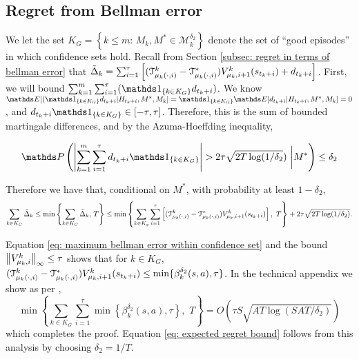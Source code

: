 \subsection{Regret from Bellman error}
We let the set $K_G=\left\{k\leq m: \, M_k, M^{*} \in \mathcal{M}_k^{\delta_{2}} \right\}$ denote the set of ``good episodes'' in which confidence sets hold. 
Recall from Section \ref{subsec: regret in terms of bellman error} that $\tilde{\Delta}_k = \sum_{i=1}^{\tau} \left[(\mathcal{T}_{\mu_{k}(\cdot,i)}^{k}-\mathcal{T}_{\mu_{k}(\cdot,i)}^{*}) V_{\mu_{k}, i+1}^{k}(s_{t_k+i})  + d_{t_k+i} \right] $. First, we will bound 
$\sum_{k=1}^{m} \sum_{i=1}^{\tau} (\Ind_{\{k \in K_G\}} d_{t_{k}+i})$. 
We know $\Exp [(\Ind_{\{k \in K_G\}} d_{t_k+i} |H_{t_k+i}, M^*, M_k]= \Ind_{\{k \in K_G\}}  \Exp [d_{t_k+i} | H_{t_k+i}, M^*, M_k]=0$, and $d_{t_k+i}\Ind_{\{k \in K_G\}}  \in [-\tau, \tau]$. Therefore, this is the sum of bounded martingale differences, and by the Azuma-Hoeffding inequality,

$$\Prob \left( \left\vert \sum_{k=1}^{m} \sum_{i=1}^{\tau} d_{t_{k}+i}\Ind_{\{k\in K_G\}} \right\vert > 2\tau \sqrt{2T \log(1/\delta_{2}}) \,\, \bigg\vert M^*  \right) \leq \delta_{2} $$

Therefore we have that, conditional on $M^*$, with probability at least $1-\delta_{2}$,
\begin{equation*}
\sum_{k\in K_G} \tilde{\Delta}_k \leq \min\left\{ \sum_{k\in K_G}\tilde{\Delta}_k, \, T\right\} \leq \min\left\{ \sum_{k\in K_g}\sum_{i=1}^{\tau} \left[ (\mathcal{T}_{\mu_{k}(\cdot,i)}^{k}-\mathcal{T}_{\mu_{k}(\cdot,i)}^{*}) V_{\mu_{k}, i+1}^{k}(s_{t_k+i})\right] , \,\, T \right\} + 2\tau \sqrt{2T \log(1/\delta_{2})}.
\end{equation*}

Equation \eqref{eq: maximum bellman error within confidence set} and the bound $\left\Vert V_{\mu_{k}, i}^{k} \right\Vert_{\infty}\leq \tau$
 shows that for $k\in K_G$, $(\mathcal{T}_{\mu_{k}(\cdot,i)}^{k}-\mathcal{T}_{\mu_{k}(\cdot,i)}^{*}) V_{\mu_{k}, i+1}^{k}(s_{t_k+i}) \leq \min\{ \beta_k^{\delta_2}(s,a), \tau\}$. In the technical appendix we show as per \cite{jaksch2010near},
\begin{equation} \label{eq: final sum}
 \min \left\{\sum_{k\in K_G} \sum_{i=1}^{\tau} \min\left\{ \beta_k^{\delta_2}(s,a), \tau\right\}, \,\, T \right\}= O\left(\tau S \sqrt{ AT \log(SAT/ \delta_{2})}\right)
\end{equation}
which completes the proof. Equation \eqref{eq: expected regret bound} follows from this analysis by choosing $\delta_2=1/T$.  






